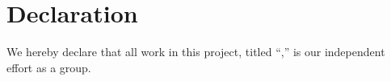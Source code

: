 \section{Declaration}

We hereby declare that all work in this project, titled
``\ProjectTitle,'' is our independent effort as a group.
